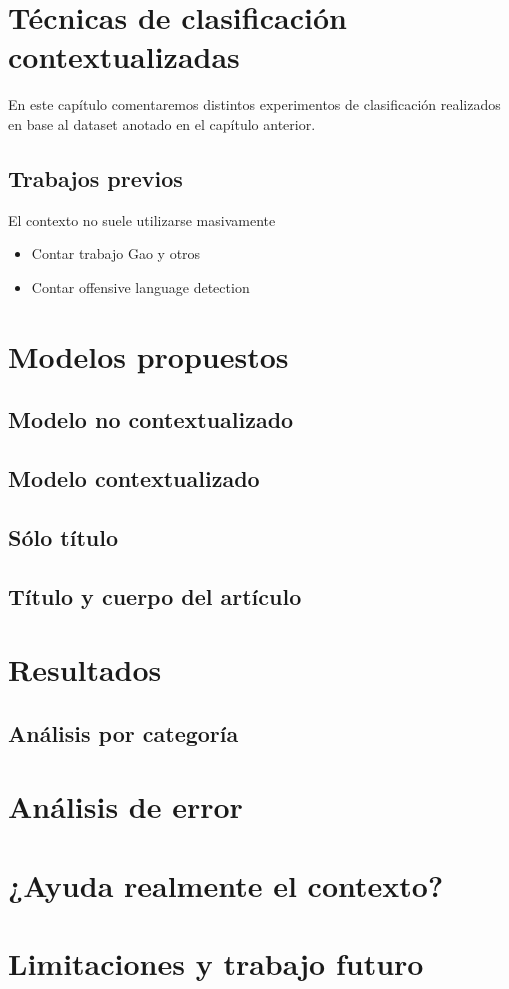 \section{Técnicas de clasificación contextualizadas}
En este capítulo comentaremos distintos experimentos de clasificación realizados en base al dataset anotado en el capítulo anterior.


\subsection{Trabajos previos}

El contexto no suele utilizarse masivamente


\begin{itemize}
    \item Contar trabajo Gao y otros
    \item Contar offensive language detection
\end{itemize}

\section{Modelos propuestos}

\subsection{Modelo no contextualizado}
\subsection{Modelo contextualizado}

\subsection{Sólo título}
\subsection{Título y cuerpo del artículo}

\section{Resultados}


\subsection{Análisis por categoría}

\section{Análisis de error}

\section{¿Ayuda realmente el contexto?}

\section{Limitaciones y trabajo futuro}